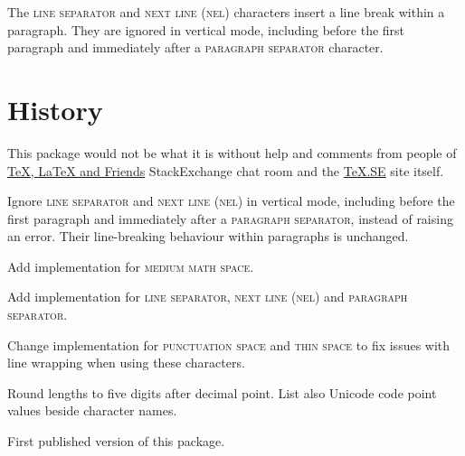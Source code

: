 \documentclass[paper=B5,DIV=calc,parskip=half]{scrartcl}
\newcommand{\punctsp}{\textsc{punctuation space}}
\newcommand{\thinsp}{\textsc{thin space}}
\newcommand{\medmathsp}{\textsc{medium math space}}
\newcommand{\linesep}{\textsc{line separator}}
\newcommand{\nel}{\textsc{next line (nel)}}
\newcommand{\parasep}{\textsc{paragraph separator}}
\begin{document}
The \linesep{} and \nel{} characters insert a line break within a paragraph.
They are ignored in vertical mode, including before the first paragraph
and immediately after a \parasep{} character.


\section{History}%
%
This package would not be what it is without help and comments from people of
\href{http://chat.stackexchange.com/rooms/41/tex-latex-and-friends}{\TeX{},
  \LaTeX{} and Friends} StackExchange chat room and the
\href{http://tex.stackexchange.com/}{\TeX.SE} site itself.

\begin{description}[style=nextline, labelwidth=4.5em, leftmargin=!,
  labelindent=0em]
  \item[\texttt{v0.06}] Ignore \linesep{} and \nel{} in vertical mode,
    including before the first paragraph and immediately after a
    \parasep{}, instead of raising an error. Their line-breaking behaviour
    within paragraphs is unchanged.
  \item[\texttt{v0.05}] Add implementation for \medmathsp{}.
  \item[\texttt{v0.04}] Add implementation for \linesep{}, \nel{}
    and \parasep{}.
  \item[\texttt{v0.03}] Change implementation for \punctsp{} and \thinsp{} to
    fix issues with line wrapping when using these characters.
  \item[\texttt{v0.02}] Round lengths to five digits after decimal
    point. List also Unicode code point values beside character names.
  \item[\texttt{v0.01}] First published version of this package.
\end{description}
\end{document}
